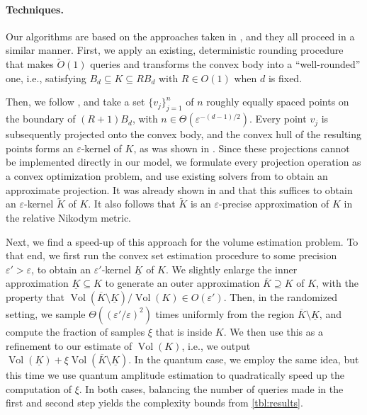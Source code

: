 \documentclass[11pt]{article}
\DeclareMathOperator{\Vol}{Vol}
\begin{document}
    \paragraph{Techniques.}

    Our algorithms are based on the approaches taken in \cite{agarwal2004approximating,chan2006faster,yu2008practical}, and they all proceed in a similar manner. First, we apply an existing, deterministic rounding procedure~\cite[Theorem~4.6.1]{grotschel2012geometric} that makes $\widetilde{O}(1)$ queries and transforms the convex body into a ``well-rounded'' one, i.e., satisfying $B_d \subseteq K \subseteq R B_d$ with $R \in O(1)$ when $d$ is fixed.

    Then, we follow \cite{yu2008practical}, and take a set $\{v_j\}_{j=1}^n$ of $n$ roughly equally spaced points on the boundary of $(R+1)B_d$, with $n \in \Theta(\varepsilon^{-(d-1)/2})$. Every point $v_j$ is subsequently projected onto the convex body, and the convex hull of the resulting points forms an $\varepsilon$-kernel of $K$, as was shown in \cite{agarwal2004approximating}. Since these projections cannot be implemented directly in our model, we formulate every projection operation as a convex optimization problem, and use existing solvers from \cite{grotschel2012geometric} to obtain an approximate projection. It was already shown in \cite{chan2006faster} and \cite[Theorem~1]{yu2008practical} that this suffices to obtain an $\varepsilon$-kernel $\widetilde{K}$ of $K$. It also follows that $\widetilde{K}$ is an $\varepsilon$-precise approximation of $K$ in the relative Nikodym metric.

    Next, we find a speed-up of this approach for the volume estimation problem. To that end, we first run the convex set estimation procedure to some precision $\varepsilon' > \varepsilon$, to obtain an $\varepsilon'$-kernel $\underline{K}$ of $K$. We slightly enlarge the inner approximation $\underline{K} \subseteq K$ to generate an outer approximation $\overline{K} \supseteq K$ of $K$, with the property that $\Vol(\overline{K} \setminus \underline{K})/\Vol(K) \in O(\varepsilon')$. Then, in the randomized setting, we sample $\Theta((\varepsilon'/\varepsilon)^2)$ times uniformly from the region $\overline{K} \setminus \underline{K}$, and compute the fraction of samples $\xi$ that is inside $K$. We then use this as a refinement to our estimate of $\Vol(K)$, i.e., we output $\Vol(\underline{K}) + \xi\Vol(\overline{K} \setminus \underline{K})$. In the quantum case, we employ the same idea, but this time we use quantum amplitude estimation to quadratically speed up the computation of $\xi$. In both cases, balancing the number of queries made in the first and second step yields the complexity bounds from \cref{tbl:results}.
\end{document}
